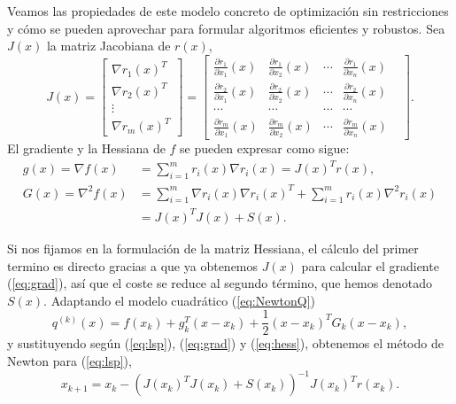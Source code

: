 \documentclass[11pt,a4paper]{book}
\theoremstyle{definition}
\theoremstyle{remark}
\begin{document}
Veamos las propiedades de este modelo concreto de optimización sin restricciones y cómo se pueden aprovechar para formular algoritmos eficientes y robustos.
Sea $J(x)$ la matriz Jacobiana de $r(x)$, 
\begin{equation}
	J(x) = 
	\begin{bmatrix}
		\nabla r_1(x)^T \\
		\nabla r_2(x)^T \\
		\vdots \\
		\nabla r_m(x)^T
	\end{bmatrix}
	=
	\begin{bmatrix}
		\frac{\partial r_1}{\partial x_1}(x) &
		\frac{\partial r_1}{\partial x_2}(x) &
		\cdots &
		\frac{\partial r_1}{\partial x_n}(x) \\
		
		\frac{\partial r_2}{\partial x_1}(x) &
		\frac{\partial r_2}{\partial x_2}(x) &
		\cdots &
		\frac{\partial r_2}{\partial x_n}(x) \\
		
		\cdots &
		\cdots &
		\cdots &
		\cdots & \\
		
		\frac{\partial r_m}{\partial x_1}(x) &
		\frac{\partial r_m}{\partial x_2}(x) &
		\cdots &
		\frac{\partial r_m}{\partial x_n}(x) 
	\end{bmatrix}.
\end{equation}
El gradiente y la Hessiana de $f$ se pueden expresar como sigue:
\begin{align}
	g(x) = \nabla f(x) &= \sum_{i=1}^m r_i(x) \nabla r_i(x) = J(x)^Tr(x), \label{eq:grad}\\
	G(x) = \nabla^2 f(x) &= \sum_{i=1}^m \nabla r_i(x) \nabla r_i(x)^T + \sum_{i=1}^m r_i(x)\nabla^2r_i(x) \nonumber \\
	&= J(x)^TJ(x)+S(x). \label{eq:hess}
\end{align}

Si nos fijamos en la formulación de la matriz Hessiana, el cálculo del primer termino es directo gracias a que ya obtenemos $J(x)$ para calcular el gradiente (\ref{eq:grad}), así que el coste se reduce al segundo término, que hemos denotado $S(x)$.
Adaptando el modelo cuadrático (\ref{eq:NewtonQ})
\begin{equation}
	q^{(k)}(x) = f(x_k) + g^T_k(x-x_k) + \frac{1}{2}(x-x_k)^TG_k(x-x_k),
	\label{eq:q}
\end{equation}
y sustituyendo según (\ref{eq:lsp}), (\ref{eq:grad}) y (\ref{eq:hess}), obtenemos el método de Newton para (\ref{eq:lsp}),
\begin{equation}
	x_{k+1} = x_k-(J(x_k)^TJ(x_k)+S(x_k))^{-1}J(x_k)^Tr(x_k).
	\label{eq:newtoniter}
\end{equation}
\end{document}
